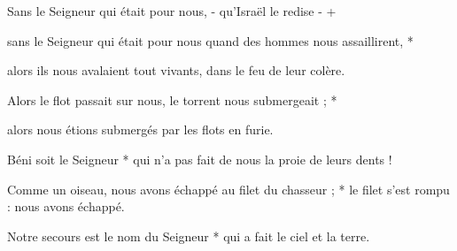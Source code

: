 \item Sans le Seigneur qui était pour nous, - qu'Israël le redise - +

\item sans le Seigneur qui était pour nous quand des hommes nous assaillirent, *

\item alors ils nous avalaient tout vivants, dans le feu de leur colère.

\item Alors le flot passait sur nous, le torrent nous submergeait ; *

\item alors nous étions submergés par les flots en furie.

\item Béni soit le Seigneur * qui n'a pas fait de nous la proie de leurs dents !

\item Comme un oiseau, nous avons échappé au filet du chasseur ; * le filet s'est rompu : nous avons échappé.

\item Notre secours est le nom du Seigneur * qui a fait le ciel et la terre.
